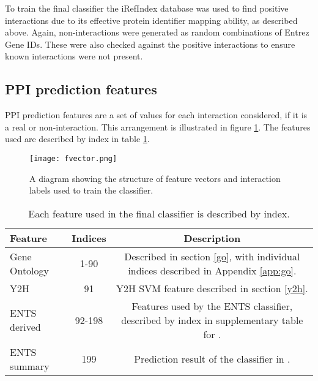 To train the final classifier the iRefIndex\autocite{razick_irefindex:_2008} database was used to find positive interactions due to its effective protein identifier mapping ability, as described above.
Again, non-interactions were generated as random combinations of Entrez Gene IDs.
These were also checked against the positive interactions to ensure known interactions were not present.

\subsection{PPI prediction features}

PPI prediction features are a set of values for each interaction considered, if it is a real or non-interaction.
This arrangement is illustrated in figure \ref{fig:fvectors}.
The features used are described by index in table \ref{tab:fvectors}.

\begin{figure}
    \centering
    \texttt{[image: fvector.png]}
    \caption{A diagram showing the structure of feature vectors and interaction labels used to train the classifier.}
    \label{fig:fvectors}
\end{figure}

\begin{table}
    \centering
    \begin{tabular}{l c c}
        Feature         & Indices & Description \\
        \hline
        Gene Ontology   & 1-90    & Described in section \ref{go}, with individual indices described in Appendix \ref{app:go}. \\
        Y2H             & 91      & Y2H SVM feature described in section \ref{y2h}. \\
        ENTS derived    & 92-198  & Features used by the ENTS classifier, described by index in supplementary table for \textcite{rodgers-melnick_predicting_2013}. \\
        ENTS summary    & 199     & Prediction result of the classifier in \textcite{rodgers-melnick_predicting_2013}. \\
    \end{tabular}
    \caption{Each feature used in the final classifier is described by index.}
    \label{tab:fvectors}
\end{table}

